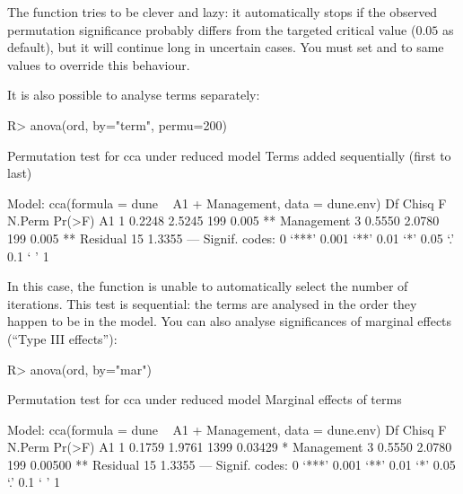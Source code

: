 \documentclass[article,nojss]{jss}
\begin{document}
The  function tries to be clever and lazy: it
automatically stops if the observed permutation significance probably
differs from the targeted critical value ($0.05$ as default), but it
will continue long in uncertain cases.  You must set  and
 to same values to override this behaviour.

It is also possible to analyse terms separately:
\begin{Schunk}
\begin{Sinput}
R> anova(ord, by="term", permu=200)
\end{Sinput}
\begin{Soutput}
Permutation test for cca under reduced model
Terms added sequentially (first to last)

Model: cca(formula = dune ~ A1 + Management, data = dune.env)
           Df  Chisq      F N.Perm Pr(>F)   
A1          1 0.2248 2.5245    199  0.005 **
Management  3 0.5550 2.0780    199  0.005 **
Residual   15 1.3355                        
---
Signif. codes:  0 ‘***’ 0.001 ‘**’ 0.01 ‘*’ 0.05 ‘.’ 0.1 ‘ ’ 1
\end{Soutput}
\end{Schunk}
In this case, the function is unable to automatically select the
number of iterations. This test is sequential: the terms are analysed
in the order they happen to be in the model. You can also analyse
significances of marginal effects (``Type III effects''):
\begin{Schunk}
\begin{Sinput}
R> anova(ord, by="mar")
\end{Sinput}
\begin{Soutput}
Permutation test for cca under reduced model
Marginal effects of terms

Model: cca(formula = dune ~ A1 + Management, data = dune.env)
           Df  Chisq      F N.Perm  Pr(>F)   
A1          1 0.1759 1.9761   1399 0.03429 * 
Management  3 0.5550 2.0780    199 0.00500 **
Residual   15 1.3355                         
---
Signif. codes:  0 ‘***’ 0.001 ‘**’ 0.01 ‘*’ 0.05 ‘.’ 0.1 ‘ ’ 1
\end{Soutput}
\end{Schunk}
\end{document}
